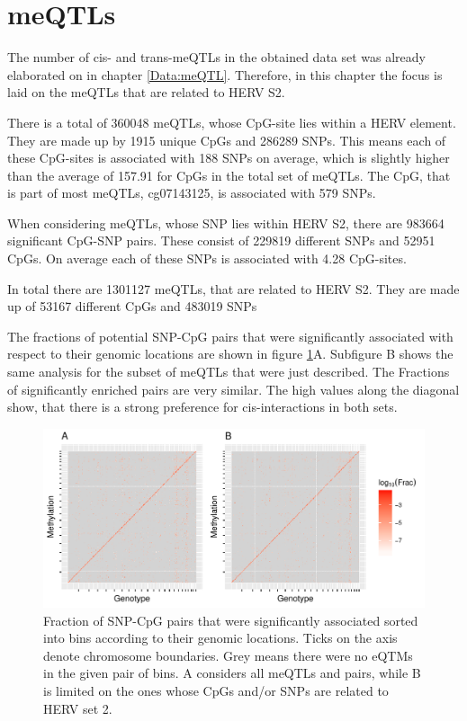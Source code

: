 \documentclass[a4paper,12pt,twoside,openright]{report}
\begin{document}
\section{meQTLs}
\label{Results:meQTLs}
The number of cis- and trans-meQTLs in the obtained data set was already elaborated on in chapter \ref{Data:meQTL}. Therefore, in this chapter the focus is laid on the meQTLs that are related to HERV S2.

There is a total of 360048 meQTLs, whose CpG-site lies within a HERV element. They are made up by 1915 unique CpGs and 286289 SNPs. This means each of these CpG-sites is associated with 188 SNPs on average, which is slightly higher than the average of 157.91 for CpGs in the total set of meQTLs. The CpG, that is part of most meQTLs, cg07143125, is associated with 579 SNPs. 

When considering meQTLs, whose SNP lies within HERV S2, there are 983664 significant CpG-SNP pairs. These consist of 229819 different SNPs and 52951 CpGs. On average each of these SNPs is associated with 4.28 CpG-sites. 

In total there are 1301127 meQTLs, that are related to HERV S2. They are made up of 53167 different CpGs and 483019 SNPs

The fractions of potential SNP-CpG pairs that were significantly associated with respect to their genomic locations are shown in figure \ref{fig:global.meqtl.heatmap}A. Subfigure B shows the same analysis for the subset of meQTLs that were just described. The Fractions of significantly enriched pairs are very similar. The high values along the diagonal show, that there is a strong preference for cis-interactions in both sets. 

\begin{figure}[tb]
	\includegraphics[scale = 1, keepaspectratio = true]{../figures/meqtl_all_herv_heatmap}  
	\caption{Fraction of SNP-CpG pairs that were significantly associated sorted into bins according to their genomic locations. Ticks on the axis denote chromosome boundaries. Grey means there were no eQTMs in the given pair of bins. A considers all meQTLs and pairs, while B is limited on the ones whose CpGs and/or SNPs are related to HERV set 2.}
    \label{fig:global.meqtl.heatmap}
\end{figure}
\end{document}
